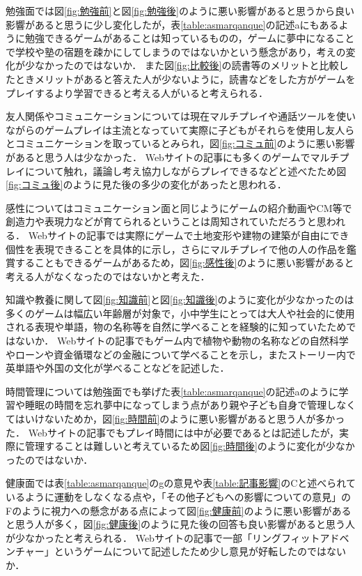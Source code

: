 \documentclass[12pt,a4j,titlepage]{ltjsarticle}
\begin{document}
勉強面では図\ref{fig:勉強前}と図\ref{fig:勉強後}のように悪い影響があると思うから良い影響があると思うに少し変化したが，表\ref{table:asmarqanque}の記述aにもあるように勉強できるゲームがあることは知っているものの，ゲームに夢中になることで学校や塾の宿題を疎かにしてしまうのではないかという懸念があり，考えの変化が少なかったのではないか．
また図\ref{fig:比較後}の読書等のメリットと比較したときメリットがあると答えた人が少ないように，読書などをした方がゲームをプレイするより学習できると考える人がいると考えられる．

友人関係やコミュニケーションについては現在マルチプレイや通話ツールを使いながらのゲームプレイは主流となっていて実際に子どもがそれらを使用し友人らとコミュニケーションを取っているとみられ，図\ref{fig:コミュ前}のように悪い影響があると思う人は少なかった．
Webサイトの記事にも多くのゲームでマルチプレイについて触れ，議論し考え協力しながらプレイできるなどと述べたため図\ref{fig:コミュ後}のように見た後の多少の変化があったと思われる．

感性についてはコミュニケーション面と同じようにゲームの紹介動画やCM等で創造力や表現力などが育てられるということは周知されていただろうと思われる．
Webサイトの記事では実際にゲームで土地変形や建物の建築が自由にでき個性を表現できることを具体的に示し，さらにマルチプレイで他の人の作品を鑑賞することもできるゲームがあるため，図\ref{fig:感性後}のように悪い影響があると考える人がなくなったのではないかと考えた．

知識や教養に関して図\ref{fig:知識前}と図\ref{fig:知識後}のように変化が少なかったのは多くのゲームは幅広い年齢層が対象で，小中学生にとっては大人や社会的に使用される表現や単語，物の名称等を自然に学べることを経験的に知っていたためではないか．
Webサイトの記事でもゲーム内で植物や動物の名称などの自然科学やローンや資金循環などの金融について学べることを示し，またストーリー内で英単語や外国の文化が学べることなどを記述した．

時間管理については勉強面でも挙げた表\ref{table:asmarqanque}の記述aのように学習や睡眠の時間を忘れ夢中になってしまう点があり親や子ども自身で管理しなくてはいけないためか，図\ref{fig:時間前}のように悪い影響があると思う人が多かった．
Webサイトの記事でもプレイ時間には中が必要であるとは記述したが，実際に管理することは難しいと考えているため図\ref{fig:時間後}のように変化が少なかったのではないか．

健康面では表\ref{table:asmarqanque}のgの意見や表\ref{table:記事影響}のCと述べられているように運動をしなくなる点や，「その他子どもへの影響についての意見」のFのように視力への懸念がある点によって図\ref{fig:健康前}のように悪い影響があると思う人が多く，図\ref{fig:健康後}のように見た後の回答も良い影響があると思う人が少なかったと考えられる．
Webサイトの記事で一部「リングフィットアドベンチャー」というゲームについて記述したため少し意見が好転したのではないか．
\end{document}
